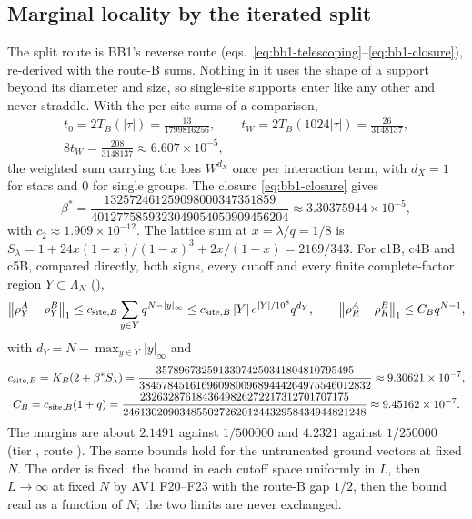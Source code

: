 \subsection{Marginal locality by the iterated split}
\label{sec:bc2-split}
The split route is BB1's reverse route
(eqs.~\eqref{eq:bb1-telescoping}--\eqref{eq:bb1-closure}), re-derived with the
route-B sums. Nothing in it uses the shape of a support beyond its diameter
and size, so single-site supports enter like any other and never straddle.
With the per-site sums of a comparison,
\begin{equation}
 \begin{gathered}
 t_0=2T_B(|\tau|)=\frac{13}{1799816256},\qquad
 t_W=2T_B(1024|\tau|)=\frac{26}{3148137},\\
 8t_W=\frac{208}{3148137}\approx6.607\times10^{-5},
 \end{gathered}
 \label{eq:bc2-sums}
\end{equation}
the weighted sum carrying the loss $W^{d_X}$ once per interaction term, with
$d_X=1$ for stars and 0 for single groups. The closure
\eqref{eq:bb1-closure} gives
\begin{equation}
 \beta^*=\frac{132572461259098000347351859}{4012775859323049054050909456204}\approx3.30375944\times10^{-5},
 \label{eq:bc2-beta}
\end{equation}
with $c_2\approx1.909\times10^{-12}$. The lattice sum at $x=\lambda/q=1/8$ is
$S_\lambda=1+24x(1+x)/(1-x)^3+2x/(1-x)=2169/343$. For c1B, c4B and c5B,
compared directly, both signs, every cutoff and every finite complete-factor
region $Y\subset\Lambda_N$ (),
\begin{equation}
 \left\lVert\rho^A_Y-\rho^B_Y\right\rVert_1\le c_{{\rm site},B}\sum_{y\in Y}q^{N-|y|_\infty}
 \le c_{{\rm site},B}\,|Y|\,e^{|Y|/10^8}q^{d_Y},\qquad
 \left\lVert\rho^A_R-\rho^B_R\right\rVert_1\le C_Bq^{N-1},
 \label{eq:bc2-locality}
\end{equation}
with $d_Y=N-\max_{y\in Y}|y|_\infty$ and
\begin{equation}
 \begin{gathered}
 c_{{\rm site},B}=K_B(2+\beta^*S_\lambda)
 =\frac{35789673259133074250341804810795495}{38457845161696098009689444264975546012832}
 \approx9.30621\times10^{-7},\\
 C_B=c_{{\rm site},B}(1+q)
 =\frac{2326328761843649826272217312701707175}{2461302090348550272620124432958434944821248}
 \approx9.45162\times10^{-7}.
 \end{gathered}
 \label{eq:bc2-constants}
\end{equation}
The margins are about $2.1491$ against $1/500000$ and $4.2321$ against
$1/250000$ (tier , route ). The
same bounds hold for the untruncated ground vectors at fixed $N$. The order is
fixed: the bound in each cutoff space uniformly in $L$, then $L\to\infty$ at
fixed $N$ by AV1 F20--F23 with the route-B gap $1/2$, then the bound read as
a function of $N$; the two limits are never exchanged.

